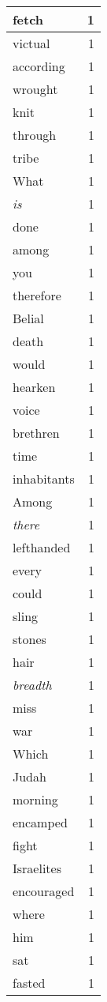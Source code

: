 \begin{center}
\begin{longtable}{l|r}
fetch & 1 \\ \hline
victual & 1 \\ \hline
according & 1 \\ \hline
wrought & 1 \\ \hline
knit & 1 \\ \hline
through & 1 \\ \hline
tribe & 1 \\ \hline
What & 1 \\ \hline
\emph{is} & 1 \\ \hline
done & 1 \\ \hline
among & 1 \\ \hline
you & 1 \\ \hline
therefore & 1 \\ \hline
Belial & 1 \\ \hline
death & 1 \\ \hline
would & 1 \\ \hline
hearken & 1 \\ \hline
voice & 1 \\ \hline
brethren & 1 \\ \hline
time & 1 \\ \hline
inhabitants & 1 \\ \hline
Among & 1 \\ \hline
\emph{there} & 1 \\ \hline
lefthanded & 1 \\ \hline
every & 1 \\ \hline
could & 1 \\ \hline
sling & 1 \\ \hline
stones & 1 \\ \hline
hair & 1 \\ \hline
\emph{breadth} & 1 \\ \hline
miss & 1 \\ \hline
war & 1 \\ \hline
Which & 1 \\ \hline
Judah & 1 \\ \hline
morning & 1 \\ \hline
encamped & 1 \\ \hline
fight & 1 \\ \hline
Israelites & 1 \\ \hline
encouraged & 1 \\ \hline
where & 1 \\ \hline
him & 1 \\ \hline
sat & 1 \\ \hline
fasted & 1 \\ \hline

\end{longtable}
\end{center}
